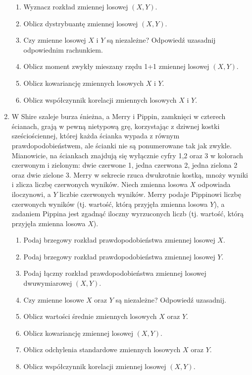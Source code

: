 \documentclass[twoside]{mwart}
\newcommand{\ans}[1]{}
\newcommand{\ans}[1]{\par\emph{Odpowiedź:} #1}
\begin{document}
\begin{enumerate}
\begin{enumerate}
\item Wyznacz rozkład zmiennej losowej $(X,Y)$. \ans{$P(0,0)=\frac{39}{52} P(1,0)=0 P(0,1)=\frac{12}{52} P(1,1)=\frac{1}{52}$}
\item Oblicz dystrybuantę zmiennej losowej $(X,Y)$.
\item Czy zmienne losowej $X$ i $Y$ są niezależne? Odpowiedź uzasadnij odpowiednim rachunkiem. \ans{Nie, $0=P(1,0)\neq P(X=1)P(Y=0)=\frac{39}{52^2}$}
\item Oblicz moment zwykły mieszany rzędu 1+1 zmiennej losowej $(X,Y)$. \ans{$EXY=\frac{1}{52}$}
\item Oblicz kowariancję zmiennych losowych $X$ i $Y$.
\item Oblicz współczynnik korelacji zmiennych losowych $X$ i $Y$.
\end{enumerate}

\item W Shire szaleje burza śnieżna, a Merry i Pippin, zamknięci w czterech ścianach, grają w pewną nietypową grę, korzystając z dziwnej kostki sześciościennej, której każda ścianka wypada z równym prawdopodobieństwem, ale ścianki nie są ponumerowane tak jak zwykle.
Mianowicie, na ściankach znajdują się wyłącznie cyfry 1,2 oraz 3 w kolorach czerwonym i zielonym: dwie czerwone 1, jedna czerwona 2, jedna zielona 2 oraz dwie zielone 3.
Merry w sekrecie rzuca dwukrotnie kostką, mnoży wyniki i zlicza liczbę czerwonych wyników.
Niech zmienna losowa $X$ odpowiada iloczynowi, a $Y$ liczbie czerwonych wyników.
Merry podaje Pippinowi liczbę czerwonych wyników (tj. wartość, którą przyjęła zmienna losowa $Y$), a zadaniem Pippina jest zgadnąć iloczny wyrzuconych liczb (tj. wartość, którą przyjęła zmienna losowa $X$).

\begin{enumerate}
	\item Podaj brzegowy rozkład prawdopodobieństwa zmiennej losowej $X$. 
	\item Podaj brzegowy rozkład prawdopodobieństwa zmiennej losowej $Y$. 
	\item Podaj łączny rozkład prawdopodobieństwa zmiennej losowej dwuwymiarowej $(X,Y)$. 
	\item Czy zmienne losowe $X$ oraz $Y$ są niezależne? Odpowiedź uzasadnij.
	\item Oblicz wartości średnie zmiennych losowych $X$ oraz $Y$.
	\item Oblicz kowariancję zmiennej losowej $(X,Y)$.
	\item Oblicz odchylenia standardowe zmiennych losowych $X$ oraz $Y$.
	\item Oblicz współczynnik korelacji zmiennej losowej $(X,Y)$.
\end{enumerate}


\end{enumerate}
\end{document}
